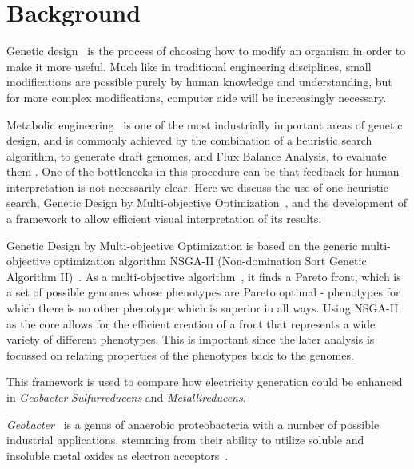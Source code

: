 \documentclass[a4paper,twocolumn]{article}
\begin{document}
\section{Background}

Genetic design~\cite{} is the process of choosing how to modify an organism in order to make it more useful. Much like in traditional engineering disciplines, small modifications are possible purely by human knowledge and understanding, but for more complex modifications, computer aide will be increasingly necessary.

Metabolic engineering~\cite{} is one of the most industrially important areas of genetic design, and is commonly achieved by the combination of a heuristic search algorithm, to generate draft genomes, and Flux Balance Analysis, to evaluate them \cite{}. One of the bottlenecks in this procedure can be that feedback for human interpretation is not necessarily clear. Here we discuss the use of one heuristic search, Genetic Design by Multi-objective Optimization~\cite{Costanza2012}, and the development of a framework to allow efficient visual interpretation of its results.

Genetic Design by Multi-objective Optimization is based on the generic multi-objective optimization algorithm NSGA-II (Non-domination Sort Genetic Algorithm II)~\cite{Deb2002a}. As a multi-objective algorithm~\cite{Gen2008}, it finds a Pareto front, which is a set of possible genomes whose phenotypes are Pareto optimal - phenotypes for which there is no other phenotype which is superior in all ways. Using NSGA-II as the core allows for the efficient creation of a front that represents a wide variety of different phenotypes. This is important since the later analysis is focussed on relating properties of the phenotypes back to the genomes.

This framework is used to compare how electricity generation could be enhanced in {\it Geobacter} {\it Sulfurreducens} and {\it Metallireducens}.

{\it Geobacter}~\cite{Lovley2011} is a genus of anaerobic proteobacteria with a number of possible industrial applications, stemming from their ability to utilize soluble and insoluble metal oxides as electron acceptors~\cite{Bond2003}. 
\end{document}
